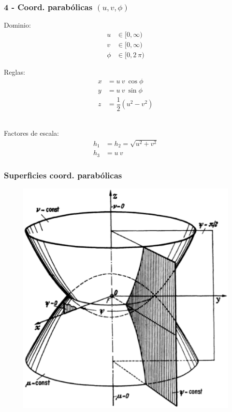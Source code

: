 \documentclass[12pt]{beamer}
\begin{document}
\begin{frame}
\frametitle{4 - Coord. parabólicas $(u, v, \phi)$}
\setlength{\abovedisplayskip}{-1pt}
\fontsize{12}{12}\selectfont
\begin{minipage}[t]{0.45\textwidth}
Dominio:
\begin{align*}
u &\in [0, \infty) \\
v &\in [0, \infty) \\
\phi &\in [0, 2 \: \pi)
\end{align*}
\end{minipage}
\hspace{1cm}
\pause
\begin{minipage}[t]{0.4\textwidth}
Reglas:
\begin{align*}
x &= u \: v \: \cos \phi \\
y &= u \: v \: \sin \phi \\
z &= \dfrac{1}{2} (u^{2} - v^{2})
\end{align*}
\end{minipage}%
\\[1em]
Factores de escala:
\begin{align*}
h_{1} &= h_{2} = \sqrt{u^{2 } +v^{2}} \\
h_{3} &= u \: v
\end{align*}
\end{frame}
\begin{frame}
\frametitle{Superficies coord. parabólicas}
\begin{figure}[H]
\centering
\includegraphics[scale=0.3]{Imagenes/Sistema_Parabolico.eps}
\end{figure}
\end{frame}
\end{document}
